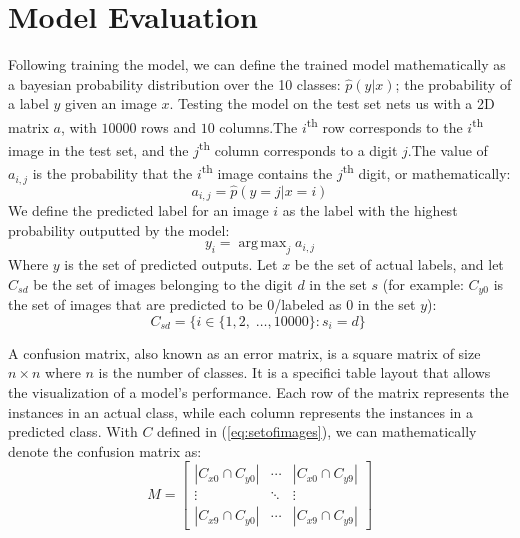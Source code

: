 \documentclass[conference]{IEEEtran}
\DeclareMathOperator*{\argmax}{arg\,max}
\begin{document}
\section{Model Evaluation}
Following training the model, we can define the trained model mathematically as a bayesian probability distribution over the 10 classes: $\hat{p}(y | x)$; the probability of a label $y$ given an image $x$.
Testing the model on the test set nets us with a 2D matrix $a$, with $10000$ rows and $10$ columns.\@ The $i$\textsuperscript{th} row corresponds to the $i$\textsuperscript{th} image in the test set, and the $j$\textsuperscript{th} column corresponds to a digit $j$.\@ The value of $a_{i,j}$ is the probability that the $i$\textsuperscript{th} image contains the $j$\textsuperscript{th} digit, or mathematically:
\begin{equation}
    a_{i,j} = \hat{p}(y = j | x = i)
\end{equation}
We define the predicted label for an image $i$ as the label with the highest probability outputted by the model:
\begin{equation}
    y_i = \argmax_j a_{i,j}
\end{equation}
Where $y$ is the set of predicted outputs. Let $x$ be the set of actual labels, and let $C_{sd}$ be the set of images belonging to the digit $d$ in the set $s$ (for example: $C_{y0}$ is the set of images that are predicted to be 0/labeled as 0 in the set $y$):
\begin{equation}
    C_{sd} = \{i \in \{1, 2, \;\ldots, 10000\} : s_i = d\}
    \;\label{eq:setofimages}
\end{equation}
\par A confusion matrix, also known as an error matrix, is a square matrix of size $n \times n$ where $n$ is the number of classes. It is a specifici table layout that allows the visualization of a model's performance. Each row of the matrix represents the instances in an actual class, while each column represents the instances in a predicted class\cite{Stehman1997}. With $C$ defined in (\ref{eq:setofimages}), we can mathematically denote the confusion matrix as:
\begin{equation}
    M = \begin{bmatrix}
        |C_{x0} \cap C_{y0}| &  \cdots & |C_{x0} \cap C_{y9}| \\
        \vdots & \ddots & \vdots \\
        |C_{x9} \cap C_{y0}| &  \cdots & |C_{x9} \cap C_{y9}|
    \end{bmatrix}
\end{equation}
\end{document}
